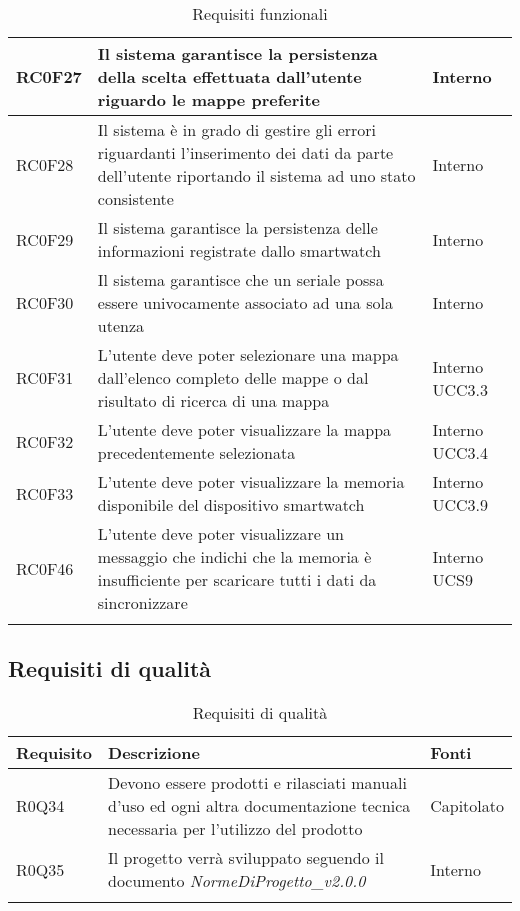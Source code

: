 \begin{center}
\begin{longtable}{|l|p{7cm}|p{1.7cm}|}
RC0F27		& Il sistema garantisce la persistenza della scelta effettuata dall'utente riguardo le mappe preferite & Interno \\\hline
RC0F28		& Il sistema è in grado di gestire gli errori riguardanti l'inserimento dei dati da parte dell'utente riportando il sistema ad uno stato consistente & Interno \\\hline
RC0F29		& Il sistema garantisce la persistenza delle informazioni registrate dallo smartwatch & Interno \\\hline
RC0F30		& Il sistema garantisce che un seriale possa essere univocamente associato ad una sola utenza & Interno \\\hline
RC0F31		& L'utente deve poter selezionare una mappa dall'elenco completo delle mappe o dal risultato di ricerca di una mappa & Interno UCC3.3 \\\hline
RC0F32		& L'utente deve poter visualizzare la mappa precedentemente selezionata & Interno UCC3.4 \\\hline
RC0F33		& L'utente deve poter visualizzare la memoria disponibile del dispositivo smartwatch & Interno UCC3.9 \\\hline
RC0F46		& L'utente deve poter visualizzare un messaggio che indichi che la memoria è insufficiente per scaricare tutti i dati da sincronizzare & Interno UCS9 \\\hline
\caption{Requisiti funzionali}
\end{longtable}
\egroup
\end{center}

\subsection{Requisiti di qualità}
\begin{center}
\bgroup
\def\arraystretch{1.8}
\begin{longtable}{|l|p{7cm}|p{1.7cm}|} \hline
\textbf{Requisito} & \textbf{Descrizione} & \textbf{Fonti} \\\hline
R0Q34		& Devono essere prodotti e rilasciati manuali d’uso ed ogni altra documentazione tecnica necessaria per l’utilizzo del prodotto & Capitolato \\\hline
R0Q35		& Il progetto verrà sviluppato seguendo il documento \textit{NormeDiProgetto\_v2.0.0} & Interno \\\hline
\caption{Requisiti di qualità}
\end{longtable}
\egroup
\end{center}

